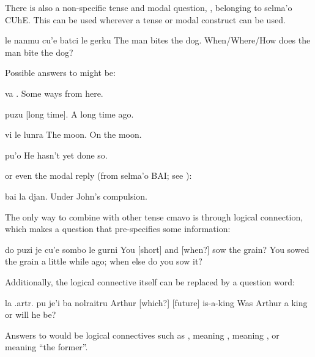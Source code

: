 There is also a non-specific tense and modal question,
    , belonging to selma'o CUhE. This can be used wherever
    a tense or modal construct can be used.
\begin{example}
le nanmu cu'e batci le gerku\n
The man  bites the dog.\n
When/Where/How does the man bite the dog?
\end{example}

Possible answers to  might be:
\begin{example}
va\n
{}.\n
Some ways from here.
\end{example}

\begin{example}
puzu\n
{} [long time].\n
A long time ago.
\end{example}

\begin{example}
vi le lunra\n
{} The moon.\n
On the moon.
\end{example}

\begin{example}
pu'o\n
{}\n
He hasn't yet done so.
\end{example}

{\noindent}or even the modal reply (from selma'o BAI; see ):
\begin{example}
bai la djan.\n
Under John's compulsion.
\end{example}

The only way to combine  with other tense cmavo is
    through logical connection, which makes a question that
    pre-specifies some information:
\begin{example}
do puzi je cu'e sombo le gurni\n
You  [short] and [when?] sow the grain?\n
You sowed the grain a little while ago;\n
\T	when else do you sow it?
\end{example}

Additionally, the logical connective itself can be replaced
    by a question word:
\begin{example}
la .artr. pu je'i ba nolraitru\n
Arthur  [which?] [future] is-a-king\n
Was Arthur a king or will he be?
\end{example}

Answers to  would be
    logical connectives such as , meaning , 
    meaning , or  meaning ``the
    former''.



